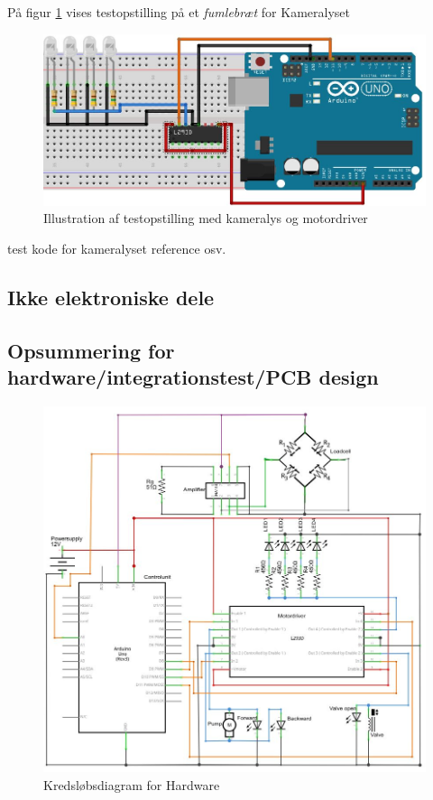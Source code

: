 På figur \ref{fig:LEDbreadboard} vises testopstilling på et \textit{fumlebræt} for Kameralyset

\begin{figure}[H]
	\centering
	\includegraphics[width=1\textwidth]{billeder/Hardware/diagrammer/LEDbreadboard.JPG}
	\caption{Illustration af testopstilling med kameralys og motordriver}
	\label{fig:LEDbreadboard}
\end{figure}

 test kode for kameralyset reference osv.
 
 
 
\subsection{Ikke elektroniske dele}
 
 
\subsection{Opsummering for hardware/integrationstest/PCB design} 

\begin{figure}[H]
	\centering
	\includegraphics[width=1\textwidth]{billeder/Hardware/diagrammer/HWdiagram.JPG}
	\caption{Kredsløbsdiagram for Hardware}
	\label{fig:HWdiagram}
\end{figure}


 